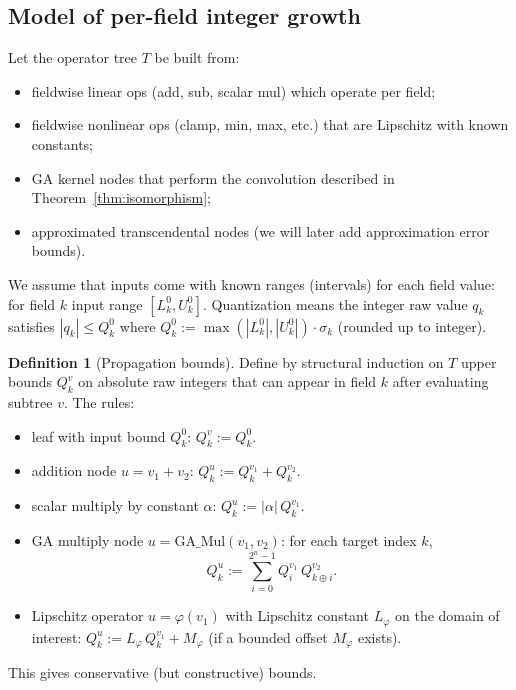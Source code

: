 \documentclass[11pt]{article}
\theoremstyle{definition}
\newtheorem{definition}{Definition}[section]
\theoremstyle{plain}
\begin{document}
\subsection{Model of per-field integer growth}
Let the operator tree \(T\) be built from:
\begin{itemize}
  \item fieldwise linear ops (add, sub, scalar mul) which operate per field;
  \item fieldwise nonlinear ops (clamp, min, max, etc.) that are Lipschitz with known constants;
  \item GA kernel nodes that perform the convolution described in Theorem~\ref{thm:isomorphism};
  \item approximated transcendental nodes (we will later add approximation error bounds).
\end{itemize}

We assume that inputs come with known ranges (intervals) for each field value: for field \(k\) input range \([L_k^0, U_k^0]\). Quantization means the integer raw value \(q_k\) satisfies \(|q_k|\le Q_k^0\) where \(Q_k^0 := \max(|L_k^0|,|U_k^0|)\cdot\sigma_k\) (rounded up to integer).

\begin{definition}[Propagation bounds]
Define by structural induction on \(T\) upper bounds \(Q_k^v\) on absolute raw integers that can appear in field \(k\) after evaluating subtree \(v\). The rules:
\begin{itemize}
  \item leaf with input bound \(Q_k^0\): \(Q_k^v := Q_k^0\).
  \item addition node \(u = v_1 + v_2\): \(Q_k^u := Q_k^{v_1} + Q_k^{v_2}\).
  \item scalar multiply by constant \(\alpha\): \(Q_k^u := |\alpha|\, Q_k^{v_1}\).
  \item GA multiply node \(u = \mathrm{GA\_Mul}(v_1,v_2)\): for each target index \(k\),
  \[
  Q_k^u := \sum_{i=0}^{2^n-1} Q_i^{v_1}\, Q_{k\oplus i}^{v_2}.
  \]
  \item Lipschitz operator \(u = \varphi(v_1)\) with Lipschitz constant \(L_\varphi\) on the domain of interest: \(Q_k^u := L_\varphi\, Q_k^{v_1} + M_\varphi\) (if a bounded offset \(M_\varphi\) exists).
\end{itemize}
\end{definition}

This gives conservative (but constructive) bounds.
\end{document}
